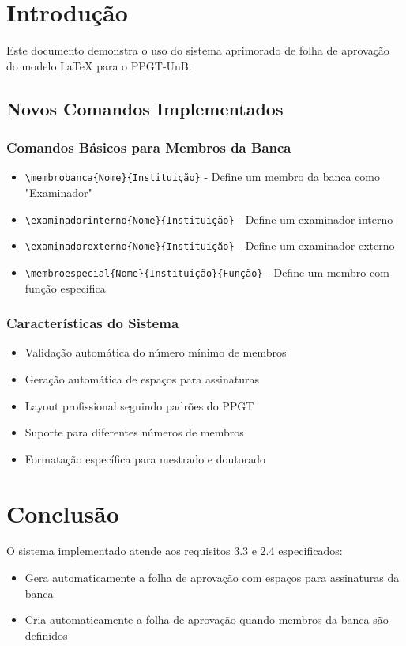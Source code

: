 \documentclass[mestrado]{UnB-PPGT}
\begin{document}
\pretextual


\textual

\chapter{Introdução}

Este documento demonstra o uso do sistema aprimorado de folha de aprovação 
do modelo LaTeX para o PPGT-UnB.

\section{Novos Comandos Implementados}

\subsection{Comandos Básicos para Membros da Banca}

\begin{itemize}
\item \texttt{\textbackslash membrobanca\{Nome\}\{Instituição\}} - Define um membro da banca como "Examinador"
\item \texttt{\textbackslash examinadorinterno\{Nome\}\{Instituição\}} - Define um examinador interno
\item \texttt{\textbackslash examinadorexterno\{Nome\}\{Instituição\}} - Define um examinador externo
\item \texttt{\textbackslash membroespecial\{Nome\}\{Instituição\}\{Função\}} - Define um membro com função específica
\end{itemize}

\subsection{Características do Sistema}

\begin{itemize}
\item Validação automática do número mínimo de membros
\item Geração automática de espaços para assinaturas
\item Layout profissional seguindo padrões do PPGT
\item Suporte para diferentes números de membros
\item Formatação específica para mestrado e doutorado
\end{itemize}

\chapter{Conclusão}

O sistema implementado atende aos requisitos 3.3 e 2.4 especificados:
\begin{itemize}
\item Gera automaticamente a folha de aprovação com espaços para assinaturas da banca
\item Cria automaticamente a folha de aprovação quando membros da banca são definidos
\end{itemize}
\end{document}
